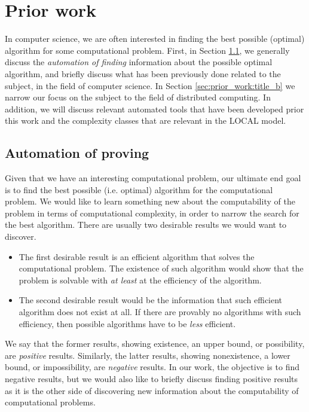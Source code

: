 
\section{Prior work} \label{sec:prior_work}
In computer science, we are often interested in finding the best possible (optimal) algorithm for some computational problem.
First, in Section \ref{sec:prior_work:title_a}, we generally discuss the \emph{automation of finding} information about the possible optimal algorithm, and briefly discuss what has been previously done related to the subject, in the field of computer science.
In Section \ref{sec:prior_work:title_b} we narrow our focus on the subject to the field of distributed computing.
In addition, we will discuss relevant automated tools that have been developed prior this work and the complexity classes that are relevant in the LOCAL model.

\subsection{Automation of proving} \label{sec:prior_work:title_a} %
Given that we have an interesting computational problem, our ultimate end goal is to find the best possible (i.e. optimal) algorithm for the computational problem.
We would like to learn something new about the computability of the problem in terms of computational complexity, in order to narrow the search for the best algorithm.
There are usually two desirable results we would want to discover.
\begin{itemize}
    \item
    The first desirable result is an efficient algorithm that solves the computational problem.
    The existence of such algorithm would show that the problem is solvable with \emph{at least} at the efficiency of the algorithm.
    \item
    The second desirable result would be the information that such efficient algorithm does not exist at all.
    If there are provably no algorithms with such efficiency, then possible algorithms have to be \emph{less} efficient.
\end{itemize}
We say that the former results, showing existence, an upper bound, or possibility, are \emph{positive} results.
Similarly, the latter results, showing nonexistence, a lower bound, or impossibility, are \emph{negative} results.
In our work, the objective is to find negative results, but we would also like to briefly discuss finding positive results as it is the other side of discovering new information about the computability of computational problems.

